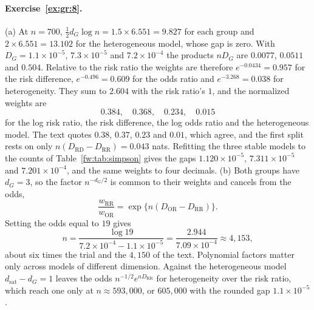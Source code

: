 \paragraph{Exercise~\ref{ex:gr:8}.} (a) At $n=700$, $\tfrac12d_G\log n=1.5\times6.551=9.827$ for each group and $2\times6.551=13.102$ for the heterogeneous model, whose gap is zero. With $D_G=1.1\times10^{-5}$, $7.3\times10^{-5}$ and $7.2\times10^{-4}$ the products $nD_G$ are $0.0077$, $0.0511$ and $0.504$. Relative to the risk ratio the weights are therefore $e^{-0.0434}=0.957$ for the risk difference, $e^{-0.496}=0.609$ for the odds ratio and $e^{-3.268}=0.038$ for heterogeneity. They sum to $2.604$ with the risk ratio's $1$, and the normalized weights are
\[
0.384,\quad0.368,\quad0.234,\quad0.015
\]
for the log risk ratio, the risk difference, the log odds ratio and the heterogeneous model. The text quotes $0.38$, $0.37$, $0.23$ and $0.01$, which agree, and the first split rests on only $n(D_{\mathrm{RD}}-D_{\mathrm{RR}})=0.043$ nats. Refitting the three stable models to the counts of Table~\ref{fw:tab:simpson} gives the gaps $1.120\times10^{-5}$, $7.311\times10^{-5}$ and $7.201\times10^{-4}$, and the same weights to four decimals. (b) Both groups have $d_G=3$, so the factor $n^{-d_G/2}$ is common to their weights and cancels from the odds,
\[
\frac{w_{\mathrm{RR}}}{w_{\mathrm{OR}}}=\exp\{n(D_{\mathrm{OR}}-D_{\mathrm{RR}})\}.
\]
Setting the odds equal to $19$ gives
\[
n=\frac{\log19}{7.2\times10^{-4}-1.1\times10^{-5}}=\frac{2.944}{7.09\times10^{-4}}\approx4{,}153,
\]
about six times the trial and the $4{,}150$ of the text. Polynomial factors matter only across models of different dimension. Against the heterogeneous model $d_{\mathrm{sat}}-d_G=1$ leaves the odds $n^{-1/2}e^{nD_{\mathrm{RR}}}$ for heterogeneity over the risk ratio, which reach one only at $n\approx593{,}000$, or $605{,}000$ with the rounded gap $1.1\times10^{-5}$.

